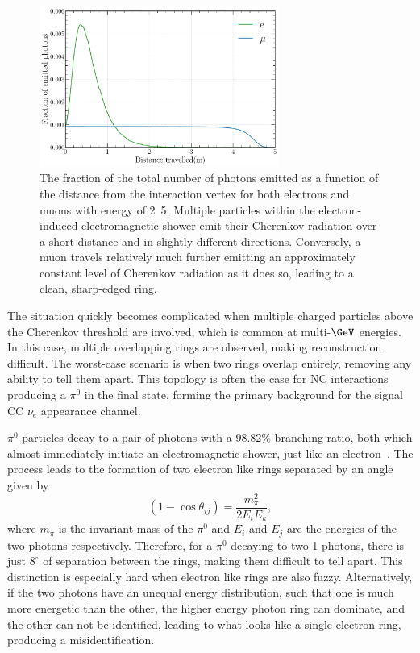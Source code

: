 \begin{figure} %
    \includegraphics[width=0.7\textwidth]{diagrams/4-chips/emission_distance.pdf}
    \caption[Fraction of Cherenkov photons emitted as a function of distance]
    {The fraction of the total number of photons emitted as a function of the distance from the
        interaction vertex for both electrons and muons with energy of \unit{2.5}{\GeV}. Multiple
        particles within the electron-induced electromagnetic shower emit their Cherenkov
        radiation over a short distance and in slightly different directions. Conversely, a muon
        travels relatively much further emitting an approximately constant level of Cherenkov
        radiation as it does so, leading to a clean, sharp-edged ring.}
    \label{fig:emission distance}
\end{figure}

The situation quickly becomes complicated when multiple charged particles above the Cherenkov
threshold are involved, which is common at multi-$\GeV$ energies. In this case, multiple
overlapping rings are observed, making reconstruction difficult. The worst-case scenario is when
two rings overlap entirely, removing any ability to tell them apart. This topology is often the
case for NC interactions producing a $\pi^{0}$ in the final state, forming the primary background
for the signal CC $\nu_{e}$ appearance channel.

$\pi^{0}$ particles decay to a pair of photons with a 98.82\% branching ratio, both which almost
immediately initiate an electromagnetic shower, just like an electron~\cite{particle2020}. The
process leads to the formation of two electron like rings separated by an angle given by
\begin{equation}
    (1-\cos\theta_{ij})=\frac{m_{\pi}^2}{2E_{i}E_{k}},
\end{equation}
where $m_{\pi}$ is the invariant mass of the $\pi^{0}$ and $E_{i}$ and $E_{j}$ are the energies of
the two photons respectively. Therefore, for a $\pi^{0}$ decaying to two \unit{1}{\GeV} photons,
there is just $8^{\circ}$ of separation between the rings, making them difficult to tell apart.
This distinction is especially hard when electron like rings are also fuzzy. Alternatively, if the
two photons have an unequal energy distribution, such that one is much more energetic than the
other, the higher energy photon ring can dominate, and the other can not be identified, leading to
what looks like a single electron ring, producing a misidentification.

